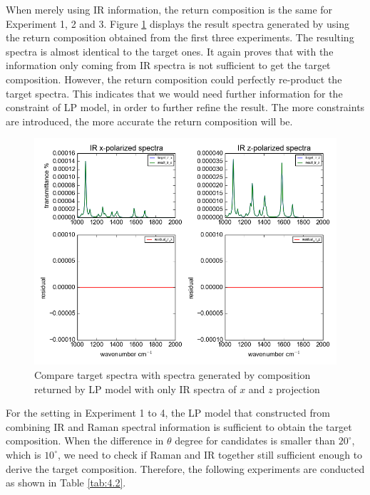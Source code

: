 When merely using IR information, the return composition is the same for Experiment 1, 2 and 3. Figure \ref{fig:4.1} displays the result spectra generated by using the return composition obtained from the first three experiments. The resulting spectra is almost identical to the target ones. It again proves that with the information only coming from IR spectra is not sufficient to get the target composition.  However, the return composition could perfectly re-product the target spectra. This indicates that we would need further information for the constraint of LP model, in order to further refine the result. The more constraints are introduced, the more accurate the return composition will be. \\

\begin{figure}[!ht] \label{fig:4.1}
\centering
\includegraphics[scale=0.7]{Figures/ir_xz_result_plotting.png}
\caption{Compare target spectra with spectra generated by composition returned by LP model with only IR spectra of $x$ and $z$ projection} 
\end{figure}

For the setting in Experiment 1 to 4, the LP model that constructed from combining IR and Raman spectral information is sufficient to obtain the target composition. When the difference in $\theta$ degree for candidates is smaller than $20^{\circ}$, which is $10^{\circ}$, we need to check if Raman and IR together still sufficient enough to derive the target composition. Therefore, the following experiments are conducted as shown in Table \ref{tab:4.2}. \\

